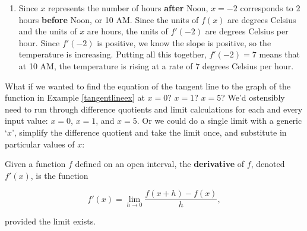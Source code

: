 \documentclass{ximera}
\begin{document}
\begin{example}
\begin{explanation}
\begin{enumerate}
Hence, the slope of the tangent line is $m_{\text{tan}} = f'(-2) = 7$.  The equation of the tangent line is: 

\[ \begin{array}{rclr}  
 y & = & f'(-2)(x - (-2)) + f(-2) & \\ 
  & = & 7(x+2) - 11 & \\
 & = & 7x+14 - 11& \\
  y & = & 7x+3& \\
 \end{array} \]

Graphing $y = 7x+3$ and $y = f(x)$ near $(-2,-11)$ reveals the local linearity we would expect.  Using the desmos graph below, we can zoom in on the point $(-2,-11)$ to our heart's content until the graph of $y = f(x)$ and the tangent line become indistinguishable.

\begin{center}
 \end{center}
 
 \item Since $x$ represents the number of hours \textbf{after} Noon, $x = -2$ corresponds to $2$ hours \textbf{before} Noon, or 10 AM.  Since the units of $f(x)$ are degrees Celsius and the units of $x$ are hours, the units of $f'(-2)$ are degrees Celsius per hour.  Since $f'(-2)$ is positive, we know the slope is positive, so the temperature is increasing.  Putting all this together,   $f'(-2) = 7$ means that at 10 AM, the temperature is rising at a rate of $7$ degrees Celsius  per hour.
 
 \end{enumerate}


\end{explanation}
\end{example}

What if we wanted to find the equation of the tangent line to the graph of the function in Example \ref{tangentlineex}  at $x = 0$?  $x = 1$?  $x = 5$?  We'd ostensibly need to run through difference quotients and limit calculations for each and every input value: $x = 0$, $x = 1$, and $x = 5$.  Or we could do a single limit with a generic `$x$', simplify the difference quotient and take the limit once, and substitute in particular values of $x$:




\begin{definition} \label{derivativefcndefn} Given a function $f$ defined on an open interval, the \textbf{derivative} of $f$, denoted  $f'(x)$, is the function

\[ f'(x) = \lim_{h \rightarrow 0}  \frac{f(x+h) - f(x)}{h},\]

provided the limit exists.

\end{definition}
\end{document}

